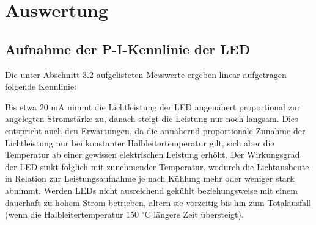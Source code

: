 \documentclass[bigchapter,colorback,accentcolor=tud4b,linedtoc,11pt]{tudreport}
\begin{document}
\chapter{Auswertung}
\section{Aufnahme der P-I-Kennlinie der LED}

Die unter Abschnitt 3.2 aufgelisteten Messwerte ergeben linear aufgetragen folgende Kennlinie:

\begin{center}
\begin{figure}[h]
\end{figure}
\end{center}

Bis etwa 20 mA nimmt die Lichtleistung der LED angenähert proportional zur angelegten Stromstärke zu, danach steigt die Leistung nur noch langsam. Dies entspricht auch den Erwartungen, da die annähernd proportionale Zunahme der Lichtleistung nur bei konstanter Halbleitertemperatur gilt, sich aber die Temperatur ab einer gewissen elektrischen Leistung erhöht. Der Wirkungsgrad der LED sinkt folglich mit zunehmender Temperatur, wodurch die Lichtausbeute in Relation zur Leistungsaufnahme je nach Kühlung mehr oder weniger stark abnimmt. Werden LEDs nicht ausreichend gekühlt beziehungsweise mit einem dauerhaft zu hohem Strom betrieben, altern sie vorzeitig bis hin zum Totalausfall (wenn die Halbleitertemperatur 150 $^{\circ}$C längere Zeit übersteigt).
\end{document}
